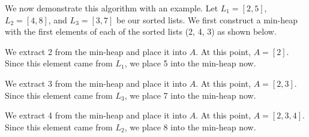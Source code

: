 \documentclass[11pt, letterpaper, titlepage]{article}
\begin{document}
\begin{enumerate}[label=\alph*)]
    We now demonstrate this algorithm with an example. Let $L_1 = [2,5]$, $L_2 = [4,8]$, and $L_3 = [3,7]$ be our sorted lists. We first construct a min-heap with the first elements of each of the sorted lists (2, 4, 3) as shown below.
    
    \begin{figure}[H]
    \centering
    \end{figure}

    We extract 2 from the min-heap and place it into $A$. At this point, $A = [2]$. Since this element came from $L_1$, we place 5 into the min-heap now.

    \begin{figure}[H]
    \centering
    \end{figure}

    We extract 3 from the min-heap and place it into $A$. At this point, $A = [2, 3]$. Since this element came from $L_3$, we place 7 into the min-heap now.

    \begin{figure}[H]
    \centering
    \end{figure}

    We extract 4 from the min-heap and place it into $A$. At this point, $A = [2, 3, 4]$. Since this element came from $L_2$, we place 8 into the min-heap now.

    \begin{figure}[H]
    \centering
    \end{figure}


\end{enumerate}
\end{document}
